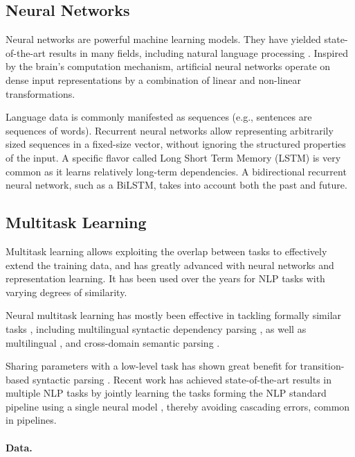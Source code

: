 \documentclass[12pt,a4paper]{report}
\begin{document}
\subsection*{Neural Networks}

Neural networks are powerful machine learning models.
They have yielded state-of-the-art results in many fields,
including natural language processing \citep{goldberg2016primer}.
Inspired by the brain's computation mechanism,
artificial neural networks operate on dense input representations
by a combination of linear and non-linear transformations.

Language data is commonly manifested as sequences
(e.g., sentences are sequences of words).
Recurrent neural networks \citep{elman1990finding} allow representing
arbitrarily sized sequences in a fixed-size vector,
without ignoring the structured properties of the input.
A specific flavor called Long Short Term Memory
(LSTM) is very common as it learns relatively long-term dependencies.
A bidirectional recurrent neural network, such as a BiLSTM,
takes into account both the past and future.


\subsection*{Multitask Learning}

Multitask learning \citep{caruana1998multitask} allows exploiting the overlap between tasks
to effectively extend the training data, 
and has greatly advanced with neural networks and representation learning.
It has been used over the years for NLP tasks with varying degrees of similarity.

Neural multitask learning has mostly been effective in tackling formally similar
tasks \citep{P16-2038},
including
multilingual syntactic dependency parsing \citep{Q16-1031,guo2016exploiting},
as well as multilingual \citep{duong2017multilingual},
and cross-domain semantic parsing \citep{herzig-berant:2017:Short,W17-2607}.

Sharing parameters with a low-level task
has shown great benefit for transition-based syntactic parsing
\citep{bohnet2012transition,Zhang2016StackpropagationIR,constant-nivre:2016:P16-1,more2016joint}.
Recent work has achieved state-of-the-art results in multiple NLP tasks
by jointly learning the tasks forming the NLP standard pipeline using 
a single neural model \citep{collobert2011natural,D17-1206},
thereby avoiding cascading errors, common in pipelines.

\paragraph{Data.}
\end{document}
